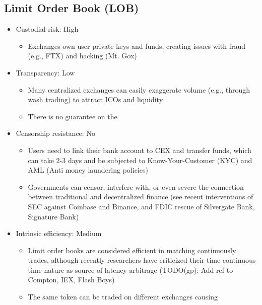 \documentclass[11pt, reqno]{amsart}
\theoremstyle{definition}
\theoremstyle{remark}
\begin{document}
\subsection{Limit Order Book (LOB)}

\begin{itemize}
	\item Custodial risk: High
	      \begin{itemize}
		      \item Exchanges own user private keys and funds, creating issues with fraud (e.g., FTX) and hacking (Mt. Gox)
	      \end{itemize}
	\item Transparency: Low
	      \begin{itemize}
              \item Many centralized exchanges can easily exaggerate volume
                (e.g., through wash trading) to attract ICOs and liquidity
		      \item There is no guarantee on the
	      \end{itemize}
	\item Censorship resistance: No
	      \begin{itemize}
              \item Users need to link their bank account to CEX and transfer
                funds, which can take 2-3 days and be subjected to
                Know-Your-Customer (KYC) and AML (Anti money laundering
                policies)
              \item Governments can censor, interfere with, or even severe the
                connection between traditional and decentralized finance (see
                recent interventions of SEC against Coinbase and Binance, and
                FDIC rescue of Silvergate Bank, Signature Bank)
	      \end{itemize}
	\item Intrinsic efficiency: Medium
	      \begin{itemize}
              \item Limit order books are considered efficient in matching
                continuously trades, although recently researchers have
                criticized their time-continuous-time nature as source of
                latency arbitrage (TODO(gp): Add ref to Compton, IEX, Flash
                Boys)
              \item The same token can be traded on different exchanges causing

\end{itemize}
\end{itemize}
\end{document}
